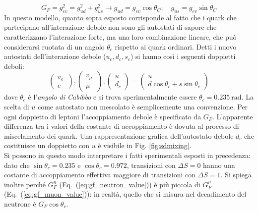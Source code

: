 \documentclass{subnucbo}
\begin{document}
\begin{equation}
        G _ { F } = g _ { e v } ^ { 2 } = g _ { u d } ^ { 2 } + g _ { u s } ^ { 2 } \longrightarrow g _ { u d } = g _ { e v } \cos \theta _ { C } ; \quad g _ { u s } = g _ { e v } \sin \theta _ { C }
\end{equation}
In questo modello, quanto sopra esposto corrisponde al fatto che i quark che partecipano all'interazione debole non sono gli autostati di sapore che caratterizzano l'interazione forte, ma una loro combinazione lineare, che può considerarsi ruotata di un angolo $\theta_{c}$ rispetto ai quark ordinari. Detti i nuovo autostati dell'interazione debole ($u_{c}, d_{c}, s_{c}$) si hanno così i seguenti doppietti deboli:
\begin{equation}
        \left( \begin{array} { c } { v _ { e } } \\ { e ^ { - } } \end{array} \right) , \left( \begin{array} { c } { v _ { \mu } } \\ { \mu ^ { - } } \end{array} \right) , \left( \begin{array} { c } { u } \\ { d _ { c } } \end{array} \right) = \left( \begin{array} { c } { u } \\ { d \cos \theta _ { c } + s \sin \theta _ { c } } \end{array} \right)
        \label{eq:weak_doublets}
\end{equation}
dove $\theta_{c}$ è l'\textit{angolo di Cabibbo} e si trova sperimentalmente essere $\theta _ { c } = 0.235\: \mathrm { rad }$. La scelta di $u$ come autostato non mescolato è semplicemente una convenzione. Per ogni doppietto di leptoni l'accoppiamento debole è specificato da $G_{F}$. L'apparente differenza tra i valori della costante di accoppiamento è dovuta al processo di miscelamento dei quark. Una rappresentazione grafica dell'autostato debole $d_{c}$ che costituisce un doppietto con $u$ è visibile in Fig. \ref{fig:sdmixing}.\\
Si possono in questo modo interpretare i fatti sperimentali esposti in precedenza: dato che $\sin\theta_{c}=0.235$ e $\cos\theta_{c}=0.972$, transizioni con $\Delta S = 0$ hanno una costante di accoppiamento effettiva maggiore di transizioni con $\Delta S = 1$. Si spiega inoltre perché $G_{F}^{n}$ (Eq.~(\ref{eq:gf_neutron_value})) è più piccola di $G_{F}^{\mu}$ (Eq.~(\ref{eq:gf_muon_value})): in realtà, quello che si misura nel decadimento del neutrone è $G_{F}\cos \theta_{c}$. \\
\end{document}
